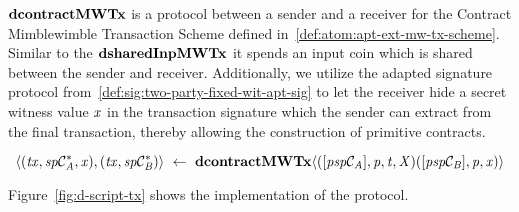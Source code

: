 $\mathbf{dcontractMWTx}$ is a protocol between a sender and a receiver for the Contract Mimblewimble Transaction Scheme defined in~\cref{def:atom:apt-ext-mw-tx-scheme}.
Similar to the $\mathbf{dsharedInpMWTx}$ it spends an input coin which is shared between the sender and receiver.
Additionally, we utilize the adapted signature protocol from~\cref{def:sig:two-party-fixed-wit-apt-sig} to let the receiver hide a secret witness value $\mathit{x}$ in the transaction signature which the sender can extract from the final transaction, thereby allowing the construction of primitive contracts.

\[ \langle (\mathit{tx}, \mathit{sp}\mathcal{C}_{\mathit{A}}^*, \mathit{x}), (\mathit{tx}, \mathit{sp}\mathcal{C}_{\mathit{B}}^*) \rangle ~\leftarrow~ \mathbf{dcontractMWTx} \langle([\mathit{psp}\mathcal{C}_{\mathit{A}}],\mathit{p},\mathit{t},\mathit{X}) ([\mathit{psp}\mathcal{C}_{\mathit{B}}],\mathit{p},\mathit{x}) \rangle \]

Figure~\cref{fig:d-script-tx} shows the implementation of the protocol.


